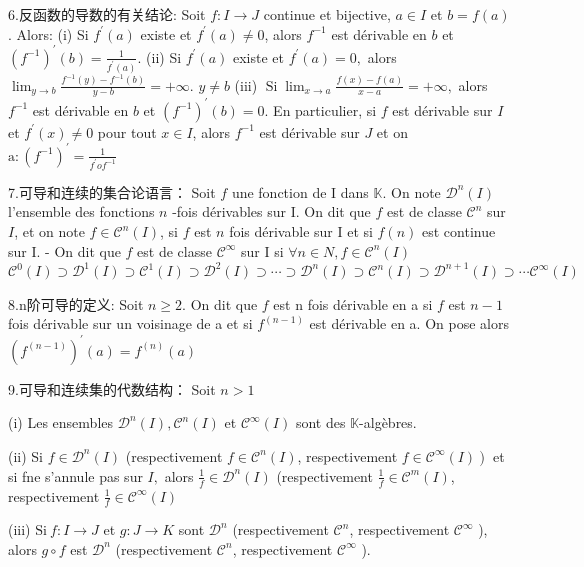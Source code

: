 \documentclass[12pt]{book}
\theoremstyle{definition}\newtheorem{dfn}{Définition}[chapter]
\theoremstyle{plain}\newtheorem{thm}{Théorème}[chapter]
\theoremstyle{plain}\newtheorem{prp}{Proposition}[chapter]
\theoremstyle{plain}\newtheorem{lem}{\bf Lemme}[chapter]
\theoremstyle{plain}\newtheorem{axm}{\bf Axiome}[chapter]
\theoremstyle{plain}\newtheorem{lmm}{\bf Lemme}[chapter]
\theoremstyle{plain}\newtheorem{cor}{\bf Corollaire}[chapter]
\theoremstyle{remark}\newtheorem{rem}{Remarque}[chapter]
\begin{document}
6.反函数的导数的有关结论:
Soit $f: I \rightarrow J$ continue et bijective, $a \in I$ et $b=f(a)$. Alors:
(i) Si $f^{\prime}(a)$ existe et $f^{\prime}(a) \neq 0$, alors $f^{-1}$ est dérivable en $b$ et $\left(f^{-1}\right)^{\prime}(b)=\frac{1}{f^{\prime}(a)}$.
(ii) Si $f^{\prime}(a)$ existe et $f^{\prime}(a)=0,$ alors $\lim _{y \rightarrow b} \frac{f^{-1}(y)-f^{-1}(b)}{y-b}=+\infty$.
$y \neq b$
(iii) $\operatorname{Si} \lim _{x \rightarrow a} \frac{f(x)-f(a)}{x-a}=+\infty,$ alors $f^{-1}$ est dérivable en $b$ et $\left(f^{-1}\right)^{\prime}(b)=0$.
En particulier, si $f$ est dérivable sur $I$ et $f^{\prime}(x) \neq 0$ pour tout $x \in I$, alors $f^{-1}$ est dérivable sur $J$ et on $\mathrm{a}:\left(f^{-1}\right)^{\prime}=\frac{1}{f^{\prime} o f^{-1}}$

7.可导和连续的集合论语言：
Soit $f$ une fonction de I dans $\mathbb{K}$. On note $\mathcal{D}^{n}(I)$ l'ensemble des fonctions $n$ -fois dérivables sur I. On dit que $f$ est de classe $\mathcal{C}^{n}$ sur $I$, et on note $f \in \mathcal{C}^{n}(I)$, si $f$ est $n$ fois dérivable sur I et si $f(n)$ est continue sur I.
- On dit que $f$ est de classe $\mathcal{C}^{\infty}$ sur I si $\forall n \in N, f \in \mathcal{C}^{n}(I)$
$\mathcal{C}^{0}(I) \supset \mathcal{D}^{1}(I) \supset \mathcal{C}^{1}(I) \supset \mathcal{D}^{2}(I) \supset \cdots \supset \mathcal{D}^{n}(I) \supset \mathcal{C}^{n}(I) \supset \mathcal{D}^{n+1}(I) \supset \cdots \mathcal{C}^{\infty}(I)$

8.n阶可导的定义: Soit $n \geq 2$. On dit que $f$ est $\mathrm{n}$ fois dérivable en a si $f$ est $n-1$ fois dérivable sur un voisinage de a et si $f^{(n-1)}$ est dérivable en a. On pose alors $\left(f^{(n-1)}\right)^{\prime}(a)=f^{(n)}(a)$

9.可导和连续集的代数结构：
Soit $n>1$

(i) Les ensembles $\mathcal{D}^{n}(I), \mathcal{C}^{n}(I)$ et $\mathcal{C}^{\infty}(I)$ sont des $\mathbb{K}$-algèbres.

(ii) Si $f \in \mathcal{D}^{n}(I)$ (respectivement $f \in \mathcal{C}^{n}(I)$, respectivement $\left.f \in \mathcal{C}^{\infty}(I)\right)$ et si fne s'annule pas sur $I,$ alors $\frac{1}{f} \in \mathcal{D}^{n}(I)$ (respectivement $\frac{1}{f} \in \mathcal{C}^{m}(I)$, respectivement $\frac{1}{f} \in \mathcal{C}^{\infty}(I)$

(iii) $\mathrm{Si}\ f: I \rightarrow J$ et $g: J \rightarrow K$ sont $\mathcal{D}^{n}$ (respectivement $\mathcal{C}^{n}$, respectivement $\mathcal{C}^{\infty}$ ), alors $g \circ f$ est $\mathcal{D}^{n}$ (respectivement $\mathcal{C}^{n}$, respectivement $\mathcal{C}^{\infty}$ ).
\end{document}
